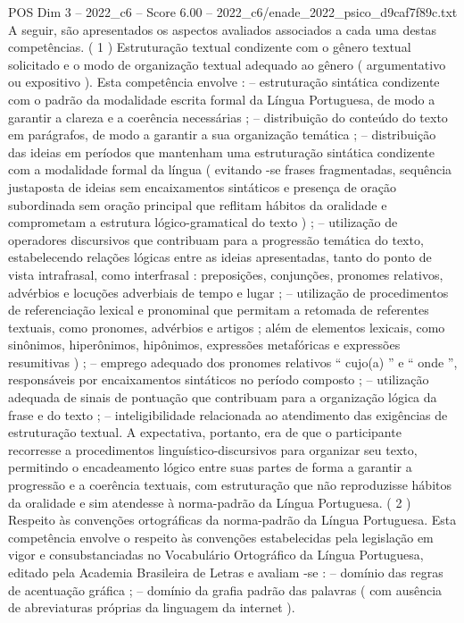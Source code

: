 \begin{textsample}{POS Dim 3 – 2022\_c6 – Score 6.00 – 2022\_c6/enade\_2022\_psico\_d9caf7f89c.txt}
A seguir, são apresentados os aspectos avaliados associados a cada uma destas competências. ( 1 ) Estruturação textual condizente com o gênero textual solicitado e o modo de organização textual adequado ao gênero ( argumentativo ou expositivo ).
Esta competência envolve : – estruturação sintática condizente com o padrão da modalidade escrita formal da Língua Portuguesa, de modo a garantir a clareza e a coerência necessárias ; – distribuição do conteúdo do texto em parágrafos, de modo a garantir a sua organização temática ; – distribuição das ideias em períodos que mantenham uma estruturação sintática condizente com a modalidade formal da língua ( evitando -se frases fragmentadas, sequência justaposta de ideias sem encaixamentos sintáticos e presença de oração subordinada sem oração principal que reflitam hábitos da oralidade e comprometam a estrutura lógico-gramatical do texto ) ; – utilização de operadores discursivos que contribuam para a progressão temática do texto, estabelecendo relações lógicas entre as ideias apresentadas, tanto do ponto de vista intrafrasal, como interfrasal : preposições, conjunções, pronomes relativos, advérbios e locuções adverbiais de tempo e lugar ; – utilização de procedimentos de referenciação lexical e pronominal que permitam a retomada de referentes textuais, como pronomes, advérbios e artigos ; além de elementos lexicais, como sinônimos, hiperônimos, hipônimos, expressões metafóricas e expressões resumitivas ) ; – emprego adequado dos pronomes relativos “ cujo(a) ” e “ onde ”, responsáveis por encaixamentos sintáticos no período composto ; – utilização adequada de sinais de pontuação que contribuam para a organização lógica da frase e do texto ; – inteligibilidade relacionada ao atendimento das exigências de estruturação textual.
A expectativa, portanto, era de que o participante recorresse a procedimentos linguístico-discursivos para organizar seu texto, permitindo o encadeamento lógico entre suas partes de forma a garantir a progressão e a coerência textuais, com estruturação que não reproduzisse hábitos da oralidade e sim atendesse à norma-padrão da Língua Portuguesa. ( 2 ) Respeito às convenções ortográficas da norma-padrão da Língua Portuguesa.
Esta competência envolve o respeito às convenções estabelecidas pela legislação em vigor e consubstanciadas no Vocabulário Ortográfico da Língua Portuguesa, editado pela Academia Brasileira de Letras e avaliam -se : – domínio das regras de acentuação gráfica ; – domínio da grafia padrão das palavras ( com ausência de abreviaturas próprias da linguagem da internet ).

\end{textsample}
